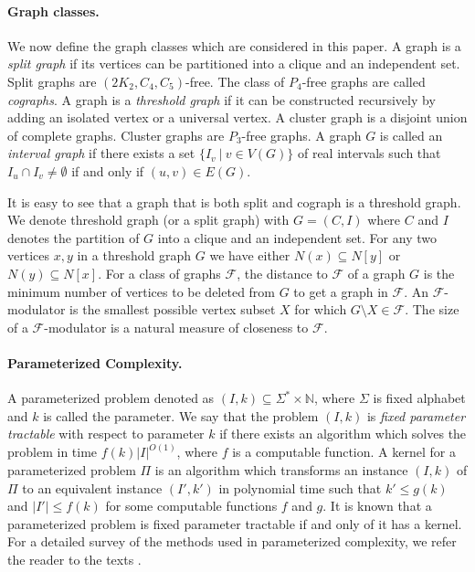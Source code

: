 \documentclass[svgnames]{llncs}
\begin{document}
\paragraph{Graph classes.} We now define the graph classes which are considered in this paper. 
 A graph is a \emph {split graph} if its vertices can be partitioned into a clique and an independent set.  Split graphs are $(2K_2,C_4,C_5)$-free. %
 The class of $P_4$-free graphs are called \emph{cographs}. 
 A graph is a \emph{threshold graph} if it can be constructed recursively by adding an isolated vertex or a universal vertex.
 A cluster graph is a disjoint union of complete graphs. Cluster graphs are $P_3$-free graphs.
 A graph $G$ is called an \emph{interval graph} if there exists a set $\{I_ v ~|~ v \in V(G) \}$ of
real intervals such that $I_u \cap I_v \neq \emptyset$  if and only if $(u,v) \in E(G)$.


 It is easy to see that a graph that is both split and cograph is a threshold graph. We denote  threshold graph (or a split graph) with $G = (C,I)$ where $C$ and $I$ denotes the partition
of $G$ into a clique and an independent set. For any two vertices $x, y$ in a threshold graph $G$ we have either $N(x)\subseteq N[y]$ or $N(y)\subseteq N[x]$. For a class of graphs $\mathcal{F}$, the distance to $\mathcal{F}$ of a graph
$G$ is the minimum number of vertices to be deleted from $G$ to get a graph in $\mathcal{F}$. 
An $\mathcal{F}$-modulator is the smallest possible
vertex subset $X$ for which $G \setminus X \in \mathcal{F}$. The size of a $\mathcal{F}$-modulator is a natural measure
of closeness to $\mathcal{F}$.

 \paragraph{Parameterized Complexity.} A parameterized problem denoted as $(I,k)\subseteq \Sigma^*\times \mathbb{N}$, where $\Sigma$ is fixed alphabet and $k$ is called the parameter. We say that the problem $(I,k)$ is {\it fixed parameter tractable} with respect to parameter $k$ if there exists an algorithm which solves the problem in time $f(k) |I|^{O(1)}$, where $f$ is a computable function. A kernel for a parameterized problem $\Pi$ is an algorithm which transforms an instance $(I,k)$ of $\Pi$ to an equivalent instance $(I',k')$ in polynomial time such that $k' \leq g(k)$ and $|I'| \leq f(k)$  for some computable functions $f$ and $g$. It is known that a parameterized problem is fixed parameter tractable if and only of it has a kernel. For a detailed survey of the methods used in parameterized complexity, we refer the reader to the texts \cite{CyganFKLMPPS15,downey2013fundamentals}.
\end{document}

